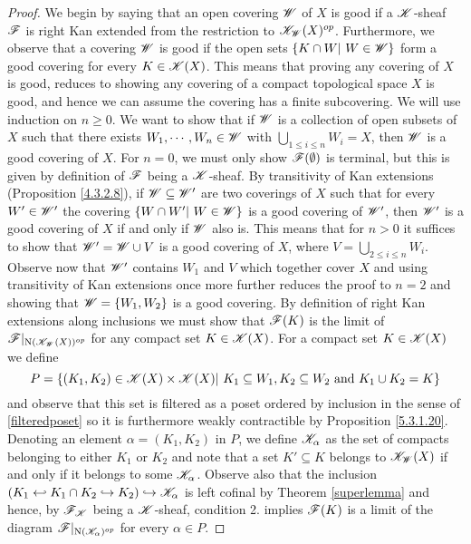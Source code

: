 \documentclass[../../thesis.tex]{subfiles}
\begin{document}
\begin{proof}
    We begin by saying that an open covering $\mathscr{W}$ of $X$ is good if a $\mathscr{K}$-sheaf $\mathscr{F}$ is right Kan extended from the restriction to $\mathscr{K}_{\mathscr{W}}(X)^{op}$.
    Furthermore, we observe that a covering $\mathscr{W}$ is good if the open sets $\{K \cap W | W \in \W\}$ form a good covering for every $K\in \mathscr{K}(X)$.
    This means that proving any covering of $X$ is good, reduces to showing any covering of a compact topological space $X$ is good, and hence we can assume the covering has a finite subcovering.
    \newline
    We will use induction on $n \geq 0$.
    We want to show that if $\mathscr{W}$ is a collection of open subsets of $X$ such that there exists $W_1, \cdots ,W_n \in \mathscr{W}$ with $\bigcup_{1 \leq i \leq n}W_i = X$, then $\mathscr{W}$ is a good covering of $X$.
    For $n=0$, we must only show $\mathscr{F}(\emptyset)$ is terminal, but this is given by definition of $\mathscr{F}$ being a $\mathscr{K}$-sheaf.
    \newline
    By transitivity of Kan extensions (Proposition \ref{4.3.2.8}), if $\mathscr{W} \subseteq \mathscr{W}'$ are two coverings of $X$ such that for every $W' \in \mathscr{W}'$ the covering $\{ W \cap W' | W \in \W\}$ is a good covering of $\mathscr{W}'$, then $\mathscr{W}'$ is a good covering of $X$ if and only if $\mathscr{W}$ also is.
    \newline
    This means that for $n>0$ it suffices to show that $\mathscr{W}' = \mathscr{W} \cup V$ is a good covering of $X$, where $V = \bigcup_{2 \leq i \leq n}W_i$.
    Observe now that $\mathscr{W}'$ contains $W_1$ and $V$ which together cover $X$ and using transitivity of Kan extensions once more further reduces the proof to $n = 2$ and showing that $\mathscr{W} = \{W_1, W_2\}$ is a good covering.
    \newline
    By definition of right Kan extensions along inclusions we must show that $\mathscr{F}(K)$ is the limit of $\mathscr{F}|_{\mathrm{N}(\mathscr{K}_{\mathscr{W}}(X))^{op}}$ for any compact set $K \in \mathscr{K}(X)$.
    For a compact set $K\in \mathscr{K}(X)$ we define
    \[
        P = \{(K_1, K_2) \in \K(X)\times \K(X) | K_1 \subseteq W_1, K_2 \subseteq W_2 \text{ and } K_1 \cup K_2 = K\}
    \]
    and observe that this set is filtered as a poset ordered by inclusion in the sense of \ref{filteredposet} so it is furthermore weakly contractible by Proposition \ref{5.3.1.20}.
    Denoting an element $\alpha = (K_1, K_2)$ in $P$, we define $\mathscr{K}_{\alpha}$ as the set of compacts belonging to either $K_1$ or $K_2$ and note that a set $K' \subseteq K$ belongs to $\mathscr{K}_{\mathscr{W}}(X)$ if and only if it belongs to some $\mathscr{K}_{\alpha}$.
    Observe also that the inclusion $(K_1 \hookleftarrow K_1 \cap K_2 \hookrightarrow K_2 ) \hookrightarrow \mathscr{K}_{\alpha}$ is left cofinal by Theorem \ref{superlemma} and hence, by $\mathscr{F}_{\mathscr{K}}$ being a $\mathscr{K}$-sheaf, condition 2. implies $\mathscr{F}(K)$ is a limit of the diagram $\mathscr{F}|_{\mathrm{N}(\mathscr{K}_{\alpha})^{op}}$ for every $\alpha \in P$.
\end{proof}
\end{document}
